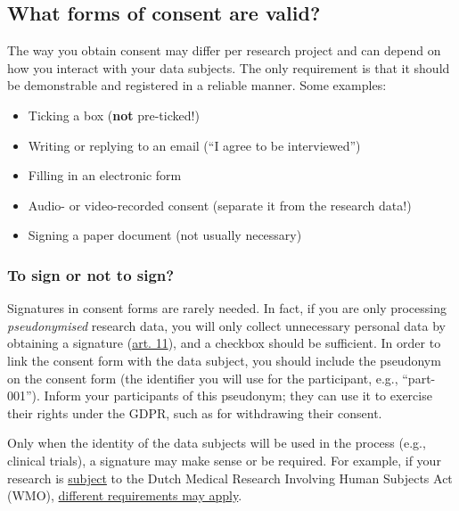 \documentclass[
]{book}
\providecommand{\tightlist}{%
  \setlength{\itemsep}{0pt}\setlength{\parskip}{0pt}}
\begin{document}
\hypertarget{forms-consent}{%
\subsection{What forms of consent are valid?}\label{forms-consent}}

The way you obtain consent may differ per research project and can depend on
how you interact with your data subjects. The only requirement is that it should
be demonstrable and registered in a reliable manner. Some examples:

\begin{itemize}
\tightlist
\item
  Ticking a box (\textbf{not} pre-ticked!)
\item
  Writing or replying to an email (``I agree to be interviewed'')
\item
  Filling in an electronic form
\item
  Audio- or video-recorded consent (separate it from the research data!)
\item
  Signing a paper document (not usually necessary)
\end{itemize}

\hypertarget{to-sign-or-not-to-sign}{%
\subsubsection{To sign or not to sign?}\label{to-sign-or-not-to-sign}}

Signatures in consent forms are rarely needed. In fact, if you are only
processing \emph{pseudonymised} research data, you will only collect unnecessary
personal data by obtaining a signature
(\href{https://gdpr-info.eu/art-11-gdpr/}{art. 11}), and a
checkbox should be sufficient. In order to link the consent form with the data
subject, you should include the pseudonym on the consent form (the identifier
you will use for the participant, e.g., ``part-001''). Inform your participants
of this pseudonym; they can use it to exercise their rights under the GDPR,
such as for withdrawing their consent.

Only when the identity of the data subjects will be used in the process (e.g.,
clinical trials), a signature may make sense or be required. For example, if
your research is
\href{https://english.ccmo.nl/investigators/legal-framework-for-medical-scientific-research/your-research-is-it-subject-to-the-wmo-or-not}{subject}
to the Dutch Medical Research Involving Human Subjects Act (WMO),
\href{https://www.ccmo.nl/onderzoekers/wet-en-regelgeving-voor-medisch-wetenschappelijk-onderzoek/de-wmo-in-een-notendop/toestemming/elektronische-toestemming}{different requirements may apply}.
\end{document}
